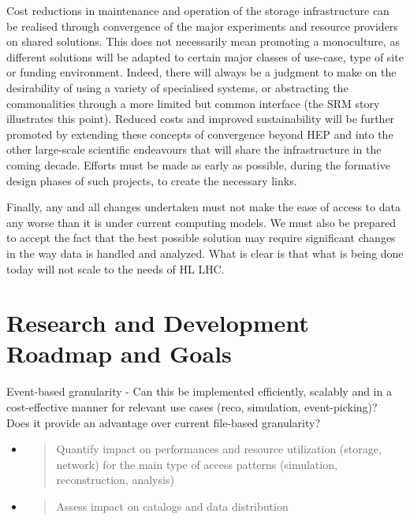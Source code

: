 \documentclass[12pt,a4paper]{article}
\begin{document}
Cost reductions in maintenance and operation of the storage
infrastructure can be realised through convergence of the major
experiments and resource providers on shared solutions. This does not
necessarily mean promoting a monoculture, as different solutions will be
adapted to certain major classes of use-case, type of site or funding
environment. Indeed, there will always be a judgment to make on the
desirability of using a variety of specialised systems, or abstracting
the commonalities through a more limited but common interface (the SRM
story illustrates this point). Reduced costs and improved sustainability
will be further promoted by extending these concepts of convergence
beyond HEP and into the other large-scale scientific endeavours that
will share the infrastructure in the coming decade. Efforts must be made
as early as possible, during the formative design phases of such
projects, to create the necessary links.

Finally, any and all changes undertaken must not make the ease of access
to data any worse than it is under current computing models. We must
also be prepared to accept the fact that the best possible solution may
require significant changes in the way data is handled and analyzed.
What is clear is that what is being done today will not scale to the
needs of HL LHC.

\section{Research and Development Roadmap and
Goals}\label{research-and-development-roadmap-and-goals}

\protect\hypertarget{_y0jes1qd33m1}{}{}Event-based granularity - Can
this be implemented efficiently, scalably and in a cost-effective manner
for relevant use cases (reco, simulation, event-picking)? Does it
provide an advantage over current file-based granularity?

\begin{itemize}
\item
  \begin{quote}
  \protect\hypertarget{_xbbh0qorjpnn}{}{}Quantify impact on performances
  and resource utilization (storage, network) for the main type of
  access patterns (simulation, reconstruction, analysis)
  \end{quote}
\end{itemize}

\begin{itemize}
\item
  \begin{quote}
  \protect\hypertarget{_ox25y1bzr703}{}{}Assess impact on catalogs and
  data distribution
  \end{quote}
\end{itemize}
\end{document}

